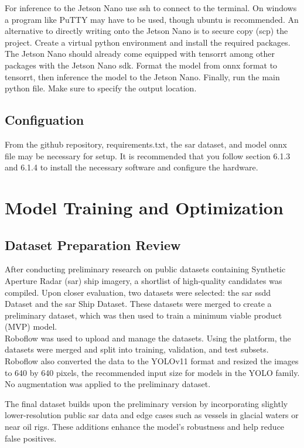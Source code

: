 \documentclass{article}
\begin{document}
For inference to the Jetson Nano use ssh to connect to the terminal. On windows a
program like PuTTY may have to be used, though ubuntu is recommended. An
alternative to directly writing onto the Jetson Nano is to secure copy (scp) the
project. Create a virtual python environment and install the required packages. The Jetson
Nano should already come equipped with \acrshort{tensorrt} among other packages with
the Jetson Nano \acrshort{sdk}. Format the model from \acrshort{onnx} format to \acrshort{tensorrt}, then
inference the model to the Jetson Nano. Finally, run the main python file. Make sure to specify the output location. \subsection{Configuation}
From the github repository, requirements.txt, the \acrshort{sar} dataset, and model \acrshort{onnx} file may
be necessary for setup. It is recommended that you follow section 6.1.3 and 6.1.4 to
install the necessary software and configure the hardware. \newpage
\section{Model Training and Optimization}
\subsection{Dataset Preparation Review}
After conducting preliminary research on public datasets containing Synthetic Aperture Radar (\acrshort{sar}) ship imagery, a shortlist of high-quality candidates was compiled. Upon closer evaluation, two datasets were selected: the \acrshort{sar} \acrshort{ssdd} Dataset and the \acrshort{sar} Ship Dataset. These datasets were merged to create a preliminary dataset, which was then used to train a minimum viable product (MVP) model.\\

Roboflow was used to upload and manage the datasets. Using the platform, the datasets were merged and split into training, validation, and test subsets. Roboflow also converted the data to the YOLOv11 format and resized the images to 640 by 640 pixels, the recommended input size for models in the YOLO family. No augmentation was applied to the preliminary dataset.

The final dataset builds upon the preliminary version by incorporating slightly lower-resolution public \acrshort{sar} data and edge cases such as vessels in glacial waters or near oil rigs. These additions enhance the model’s robustness and help reduce false positives.\\
\end{document}
